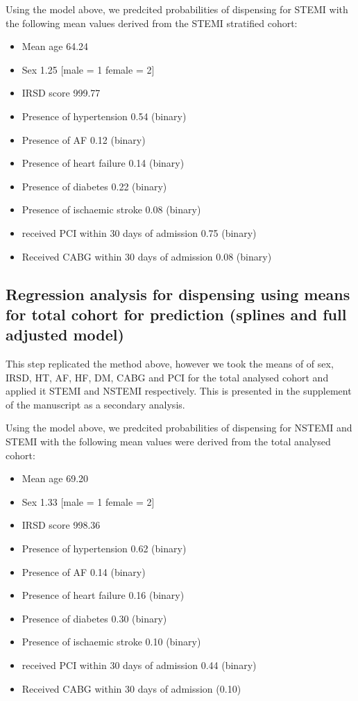 \documentclass[11pt]{article}
\begin{document}
Using the model above, we predcited probabilities of dispensing for STEMI with the following mean values derived from the STEMI stratified cohort: \\
\begin{itemize}
\item Mean age 64.24
\item Sex 1.25 [male = 1 female = 2]
\item IRSD score 999.77
\item Presence of hypertension 0.54 (binary)
\item Presence of AF 0.12 (binary)
\item Presence of heart failure 0.14 (binary)
\item Presence of diabetes 0.22 (binary)
\item Presence of ischaemic stroke 0.08 (binary)
\item received PCI within 30 days of admission 0.75 (binary)
\item Received CABG within 30 days of admission 0.08 (binary)
\end{itemize}
\color{violet}
\begin{stlog}\end{stlog}
\color{black}
\subsection{Regression analysis for dispensing using means for total cohort for prediction (splines and full adjusted model)}
This step replicated the method above, however we took the means of of sex, IRSD, HT, AF, HF, DM, CABG and PCI for the total analysed cohort and applied it STEMI and NSTEMI respectively. This is presented in the supplement of the manuscript as a secondary analysis. 
\color{violet}
\begin{stlog}\end{stlog}
\color{black}
Using the model above, we predcited probabilities of dispensing for NSTEMI and STEMI with the following mean values were derived from the total analysed cohort: \\
\begin{itemize}
\item Mean age 69.20
\item Sex 1.33 [male = 1 female = 2]
\item IRSD score 998.36
\item Presence of hypertension 0.62 (binary)
\item Presence of AF 0.14 (binary)
\item Presence of heart failure 0.16 (binary)
\item Presence of diabetes 0.30 (binary)
\item Presence of ischaemic stroke 0.10 (binary)
\item received PCI within 30 days of admission 0.44 (binary)
\item Received CABG within 30 days of admission (0.10)
\end{itemize}
\color{violet}
\begin{stlog}\end{stlog}
\color{black}
\end{document}
